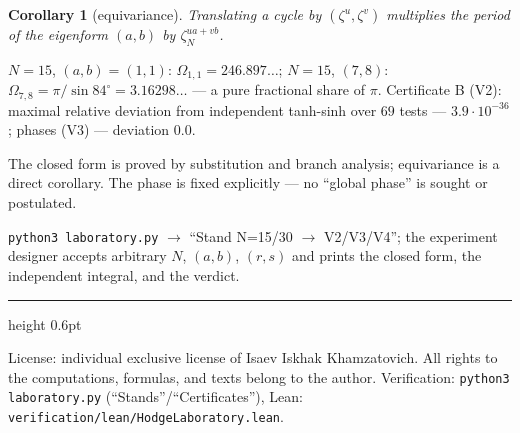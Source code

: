 \documentclass[11pt,a4paper]{article}
\theoremstyle{plain}
\newtheorem{corollary}[theorem]{Corollary}
\theoremstyle{definition}
\theoremstyle{remark}
\begin{document}
\begin{corollary}[equivariance]
Translating a cycle by $(\zeta^u,\zeta^v)$ multiplies the period of
the eigenform $(a,b)$ by $\zeta_N^{ua+vb}$.
\end{corollary}

\begin{databox}[numbers]
$N=15$, $(a,b)=(1,1)$: $\Omega_{1,1}=246.897\ldots$;
$N=15$, $(7,8)$: $\Omega_{7,8}=\pi/\sin84^\circ=3.16298\ldots$ ---
a pure fractional share of $\pi$. Certificate B (V2): maximal
relative deviation from independent tanh-sinh over $69$ tests ---
$3.9\cdot10^{-36}$; phases (V3) --- deviation $0.0$.
\end{databox}

\begin{statusbox}[summary]
The closed form is proved by substitution and branch analysis;
equivariance is a direct corollary. The phase is fixed explicitly ---
no ``global phase'' is sought or postulated.
\end{statusbox}

\begin{verifybox}[reproduction]
\texttt{python3 laboratory.py} $\to$ ``Stand N=15/30 $\to$
V2/V3/V4''; the experiment designer accepts arbitrary $N$, $(a,b)$,
$(r,s)$ and prints the closed form, the independent integral, and
the verdict.
\end{verifybox}

\vfill
{\color{linkblue}\hrule height 0.6pt}
\vspace{0.5em}
{\small\color{gray}
License: individual exclusive license of Isaev Iskhak Khamzatovich.
All rights to the computations, formulas, and texts belong to the author.
Verification: \texttt{python3 laboratory.py} (``Stands''/``Certificates''),
Lean: \texttt{verification/lean/HodgeLaboratory.lean}.
}
\end{document}
